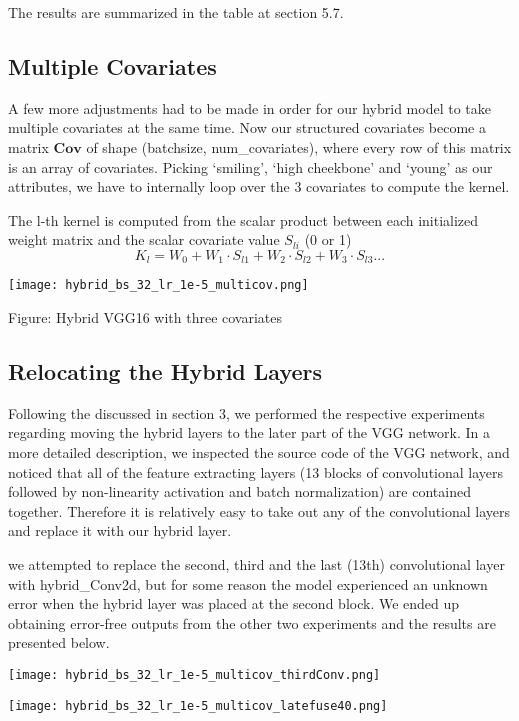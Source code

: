 \documentclass[12pt]{article}
\begin{document}
The results are summarized in the table at section 5.7.


\subsection{Multiple Covariates}
A few more adjustments had to be made in order for our hybrid model to take multiple covariates at the same time. Now our structured covariates become a matrix $\mathbf{Cov}$ of shape (batchsize, num\_covariates), where every row of this matrix is an array of covariates. Picking `smiling', `high cheekbone' and `young' as our attributes, we have to internally loop over the 3 covariates to compute the kernel. 

The l-th kernel is computed from the scalar product between each initialized weight matrix and the scalar covariate value $S_{li}$ (0 or 1)
$$K_l = W_0 + W_1 \cdot S_{l1} + W_2 \cdot S_{l2} + W_3 \cdot S_{l3}...$$

\texttt{[image: hybrid\_bs\_32\_lr\_1e-5\_multicov.png]}

Figure: Hybrid VGG16 with three covariates

\subsection{Relocating the Hybrid Layers}

Following the discussed in section 3, we performed the respective experiments regarding moving the hybrid layers to the later part of the VGG network. In a more detailed description, we inspected the source code of the VGG network, and noticed that all of the feature extracting layers (13 blocks of convolutional layers followed by non-linearity activation and batch normalization) are contained together. Therefore it is relatively easy to take out any of the convolutional layers and replace it with our hybrid layer. 

we attempted to replace the second, third and the last (13th) convolutional layer with hybrid\_Conv2d, but for some reason the model experienced an unknown error when the hybrid layer was placed at the second block. We ended up obtaining error-free outputs from the other two experiments and the results are presented below.



\texttt{[image: hybrid\_bs\_32\_lr\_1e-5\_multicov\_thirdConv.png]}

\texttt{[image: hybrid\_bs\_32\_lr\_1e-5\_multicov\_latefuse40.png]}
\end{document}
